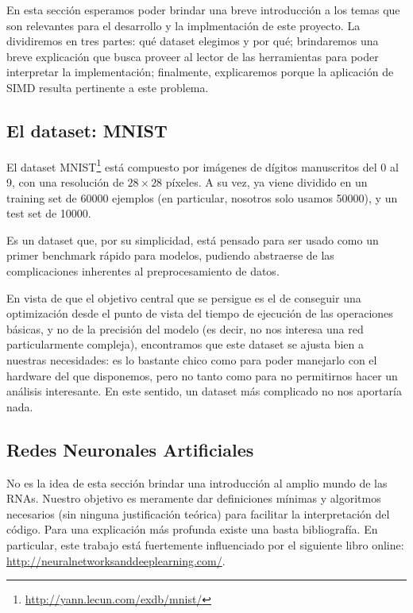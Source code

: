 En esta sección esperamos poder brindar una breve introducción a los temas que son relevantes para el desarrollo y la implmentación de este proyecto. La dividiremos en tres partes: qué dataset elegimos y por qué; brindaremos una breve explicación que busca proveer al lector de las herramientas para poder interpretar la implementación; finalmente, explicaremos porque la aplicación de SIMD resulta pertinente a este problema.

\subsection{El dataset: MNIST}

El dataset MNIST\footnote{\url{http://yann.lecun.com/exdb/mnist/}} está compuesto por imágenes de dígitos manuscritos del 0 al 9, con una resolución de $28\times 28$ píxeles. A su vez, ya viene dividido en un training set de 60000 ejemplos (en particular, nosotros solo usamos 50000), y un test set de 10000.

Es un dataset que, por su simplicidad, está pensado para ser usado como un primer benchmark rápido para modelos, pudiendo abstraerse de las complicaciones inherentes al preprocesamiento de datos. 

En vista de que el objetivo central que se persigue es el de conseguir una optimización desde el punto de vista del tiempo de ejecución de las operaciones básicas, y no de la precisión del modelo (es decir, no nos interesa una red particularmente compleja), encontramos que este dataset se ajusta bien a nuestras necesidades: es lo bastante chico como para poder manejarlo con el hardware del que disponemos, pero no tanto como para no permitirnos hacer un análisis interesante. En este sentido, un dataset más complicado no nos aportaría nada.

\subsection{Redes Neuronales Artificiales}

No es la idea de esta sección brindar una introducción al amplio mundo de las RNAs. Nuestro objetivo es meramente dar definiciones mínimas y algoritmos necesarios (sin ninguna justificación teórica) para facilitar la interpretación del código. Para una explicación más profunda existe una basta bibliografía. En particular, este trabajo está fuertemente influenciado por el siguiente libro online: \url{http://neuralnetworksanddeeplearning.com/}.

